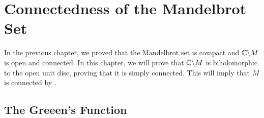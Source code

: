 \chapter{Connectedness of the Mandelbrot Set}
In the previous chapter, we proved that the Mandelbrot set is compact and \( \mathbb{C}\backslash M \)
is open and connected. In this chapter, we will prove that \( \hat{\mathbb{C}}\backslash M \) is biholomorphic
to the open unit disc, proving that it is simply connected. This will imply that \( M \) is connected by .

\section{The Greeen's Function}


